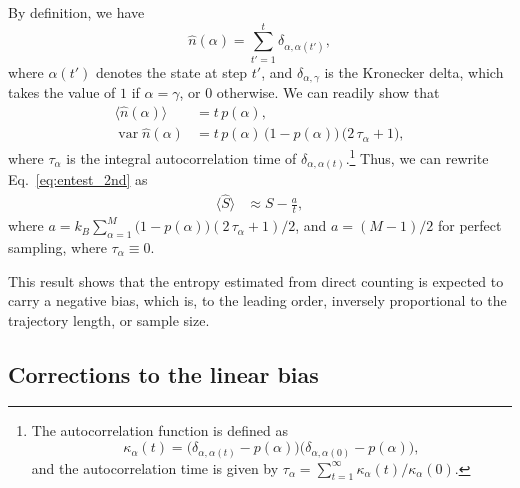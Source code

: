 \documentclass[reprint, superscriptaddress]{revtex4-1}
\begin{document}
By definition, we have
%
\begin{equation*}
  \hat{n}(\alpha) = \sum_{t' = 1}^t \delta_{\alpha, \alpha(t')},
\end{equation*}
%
where $\alpha(t')$ denotes the state at step $t'$,
and $\delta_{\alpha, \gamma}$ is the Kronecker delta,
which takes the value of $1$ if $\alpha = \gamma$, or $0$ otherwise.
%
We can readily show that
\begin{align*}
  \bigl\langle \hat{n}(\alpha) \bigr\rangle
  &=
  t \, p(\alpha), \\
  \operatorname{var}{\hat{n}(\alpha)}
  &=
  t \, p(\alpha) \, \bigl( 1 - p(\alpha) \bigr) \, \bigl(2 \, \tau_\alpha + 1\bigr)
  ,
\end{align*}
%
where $\tau_\alpha$ is the integral autocorrelation time of $\delta_{\alpha, \alpha(t)}$.\footnote{
The autocorrelation function is defined as
$$
\kappa_\alpha(t) = \bigl(\delta_{\alpha, \alpha(t)} - p(\alpha)\bigr)
\bigl(\delta_{\alpha, \alpha(0)} - p(\alpha)\bigr),
$$
and the autocorrelation time is given by
$\tau_\alpha = \sum_{t = 1}^\infty \kappa_\alpha(t)/\kappa_\alpha(0)$.
}
%
Thus, we can rewrite Eq.~\eqref{eq:entest_2nd} as
%
\begin{align}
  \bigl\langle \hat S \bigr\rangle
  &\approx
  S - \frac{ a } { t }
  ,
  \label{eq:Shat_ave}
\end{align}
%
where $a = k_B \sum_{\alpha = 1}^M
    \bigl(1 - p(\alpha)\bigr) ( 2 \, \tau_\alpha + 1)/2$,
%
and $a = (M-1)/2$ for perfect sampling, where $\tau_\alpha \equiv 0$.

This result shows that the entropy estimated
from direct counting
is expected to carry a negative bias,
which is, to the leading order,
inversely proportional to the trajectory length,
or sample size.



\subsection{Corrections to the linear bias}
\end{document}
